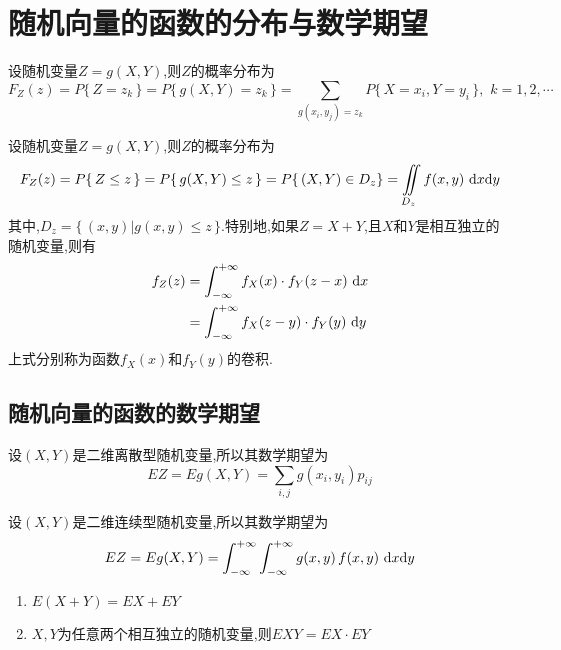\section{随机向量的函数的分布与数学期望}
\par 设随机变量$Z=g(X,Y)$,则$Z$的概率分布为
\begin{equation}
F_Z(z)=P \lbrace \, Z = z_k \, \rbrace=P \lbrace \, g(X,Y) = z_k \, \rbrace = \sum\limits_{g(x_i,y_j)=z_k}P \lbrace \, X=x_i,Y=y_i\,\rbrace,\,\,k=1,2,\cdots
\end{equation}

\noindent {}
\par 设随机变量$Z=g(X,Y)$,则$Z$的概率分布为
\begin{equation}
F_Z(z)=P \lbrace \, Z\le  z \, \rbrace=P \lbrace \, g(X,Y) \le  z \, \rbrace = P \lbrace \,(X,Y)\in D_z \rbrace = \iint\limits_{D_z}f(x,y)\,\,{\rm{d}} x{\rm{d}} y
\end{equation}
其中,$D_z= \lbrace \, (x,y) | g(x,y) \le z \, \rbrace$.特别地,如果$Z=X+Y$,且$X$和$Y$是相互独立的随机变量,则有
\begin{equation}
\begin{split}
f_Z(z)&=\int_{- \infty }^{+\infty }f_X(x)\cdot f_Y(z-x)\,\,{\rm{d}} x\\
&=\int_{- \infty }^{+\infty }f_X(z-y)\cdot f_Y(y)\,\,{\rm{d}} y
\end{split}
\end{equation}
上式分别称为函数$f_X(x)$和$f_Y(y)$的卷积.\jg

\subsection{随机向量的函数的数学期望}
\par 设$(X,Y)$是二维离散型随机变量,所以其数学期望为
\begin{equation}
EZ=Eg(X,Y)=\sum\limits_{i,j}g(x_i,y_i)p_{ij}
\end{equation}

\noindent {}
\par 设$(X,Y)$是二维连续型随机变量,所以其数学期望为
\begin{equation}
EZ=Eg(X,Y)=\int_{-\infty}^{+\infty}\int_{-\infty}^{+\infty}g(x,y)\,f(x,y)\,\,{\rm{d}} x {\rm{d}} y
\end{equation}

\noindent \dya[数学期望的性质]
\begin{enumerate}[1.]
	\setlength{\itemindent}{2em}
	\setlength{\topsep}{0.01em}
	\setlength{\itemsep}{0.01em}
	\item $E(X+Y)=EX+EY$
	\item $X,Y$为任意两个相互独立的随机变量,则$EXY=EX\cdot EY$
\end{enumerate}

